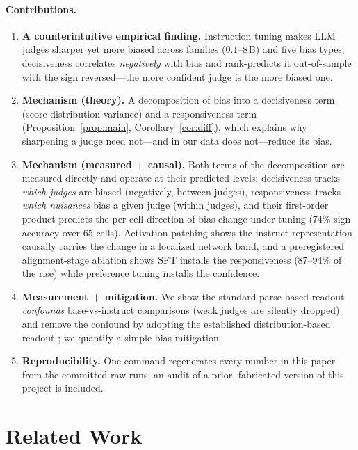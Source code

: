 \documentclass[11pt]{article}
\begin{document}
\paragraph{Contributions.}
\begin{enumerate}\itemsep2pt
  \item \textbf{A counterintuitive empirical finding.} Instruction tuning makes LLM
        judges sharper yet more biased across \NFAM{} families ($0.1$--$8$B) and five
        bias types; decisiveness correlates \emph{negatively} with bias and rank-predicts
        it out-of-sample with the sign reversed---the more confident judge is the more
        biased one.
  \item \textbf{Mechanism (theory).} A decomposition of bias into a decisiveness term
        (score-distribution variance) and a responsiveness term (Proposition~\ref{prop:main},
        Corollary~\ref{cor:diff}), which explains why sharpening a judge need not---and in
        our data does not---reduce its bias.
  \item \textbf{Mechanism (measured + causal).} Both terms of the decomposition are
        measured directly and operate at their predicted levels: decisiveness tracks
        \emph{which judges} are biased (negatively, between judges), responsiveness tracks
        \emph{which nuisances} bias a given judge (within judges), and their first-order
        product predicts the per-cell direction of bias change under tuning (74\% sign
        accuracy over 65 cells). Activation patching shows the instruct representation
        causally carries the change in a localized network band, and a preregistered
        alignment-stage ablation shows SFT installs the responsiveness (87--94\% of the
        rise) while preference tuning installs the confidence.
  \item \textbf{Measurement + mitigation.} We show the standard parse-based readout
        \emph{confounds} base-vs-instruct comparisons (weak judges are silently dropped)
        and remove the confound by adopting the established distribution-based readout
        \citep{liu2023geval,wang2025judgmentdist}; we quantify a simple bias mitigation.
  \item \textbf{Reproducibility.} One command regenerates every number in this paper
        from the committed raw runs; an audit of a prior, fabricated version of this
        project is included.
\end{enumerate}

\section{Related Work}
\end{document}
